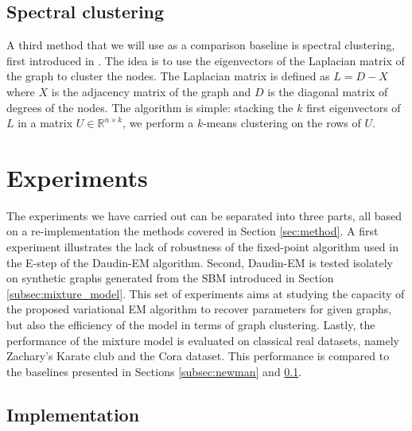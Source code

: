 \documentclass[switch, 12pt]{article}
\newcommand{\jump}{\newline\newline}
\begin{document}
\begin{multicols}{2}
    \subsection{Spectral clustering}
    \label{subsec:spectral}
    A third method that we will use as a comparison baseline is spectral clustering, first introduced in \cite{spectral}. The idea is to use the eigenvectors of the Laplacian matrix of the graph to cluster the nodes. The Laplacian matrix is defined as $ L = D - X$ where $X$ is the adjacency matrix of the graph and $D$ is the diagonal matrix of degrees of the nodes.
    \jump
    The algorithm is simple: stacking the $k$ first eigenvectors of $L$ in a matrix $U \in \mathbb{R}^{n \times k}$, we perform a $k$-means clustering on the rows of $U$.

    \section{Experiments}
    \label{sec:experiments}

    The experiments we have carried out can be separated into three parts, all based on a re-implementation the methods covered in Section \ref{sec:method}. A first experiment illustrates the lack of robustness of the fixed-point algorithm used in the E-step of the Daudin-EM algorithm.
    Second, Daudin-EM is tested isolately on synthetic graphs generated from the SBM introduced in Section \ref{subsec:mixture_model}. This set of experiments aims at studying the capacity of the proposed variational EM algorithm to recover parameters for given graphs, but also the efficiency of the model in terms of graph clustering.
    Lastly, the performance of the mixture model is evaluated on classical real datasets, namely Zachary's Karate club and the Cora dataset. This performance is compared to the baselines presented in Sections \ref{subsec:newman} and \ref{subsec:spectral}.

    \subsection{Implementation}


\end{multicols}
\end{document}
